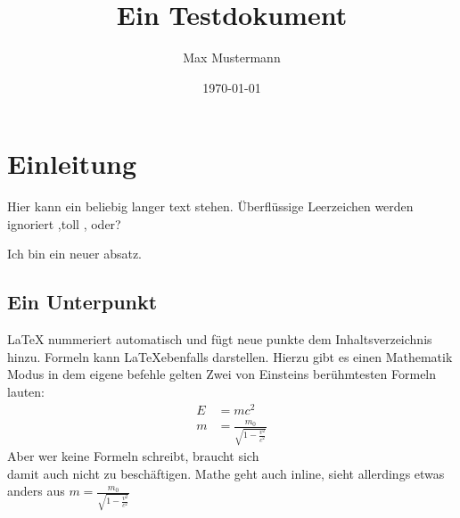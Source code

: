 \documentclass{scrartcl} %
\title{Ein Testdokument}
\author{Max Mustermann}
\date{\today}
\begin{document}
\maketitle %
\tableofcontents %
\section{Einleitung}
 
Hier kann ein beliebig langer text stehen.       Überflüssige Leerzeichen werden ignoriert
,toll , oder?
 
Ich bin ein neuer absatz.

\subsection{Ein Unterpunkt}
 \LaTeX{} nummeriert automatisch und fügt neue punkte dem Inhaltsverzeichnis hinzu.
Formeln kann \LaTeX ebenfalls darstellen. Hierzu gibt es einen Mathematik Modus in dem eigene befehle gelten
Zwei von Einsteins berühmtesten Formeln lauten:
\begin{align} %
E &= mc^2                                  \\
m &= \frac{m_0}{\sqrt{1-\frac{v^2}{c^2}}}
\end{align}
Aber wer keine Formeln schreibt, braucht sich \\ %
damit auch nicht zu beschäftigen.
Mathe geht auch inline, sieht allerdings etwas anders aus
 $ m = \frac{m_0}{\sqrt{1-\frac{v^2}{c^2}}} $
\end{document}
